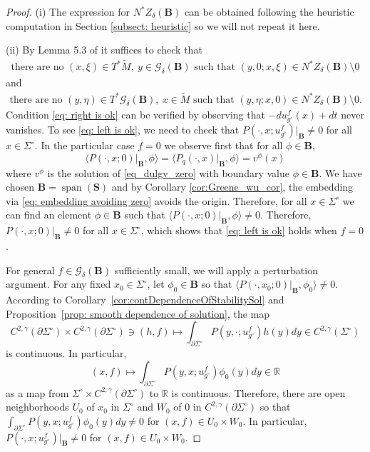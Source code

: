 \documentclass[11pt]{amsart}
\theoremstyle{definition}
\numberwithin{equation}{section}
\newcommand{\mR}{\mathbb{R}}                    %
\newcommand{\p}{\partial}
\newcommand{\BB}{\mathbf B}
\newcommand{\SSS}{\mathbf S}
\begin{document}
\begin{proof}
(i) The expression for $N^*Z_\delta(\BB)$ can be obtained following the heuristic computation in Section \ref{subsect: heuristic} so we will not repeat it here.

(ii) By Lemma 5.3 of \cite{MST} it suffices to check that 
\begin{eqnarray}
    \label{eq: left is ok}
\text{there are no } (x,\xi) \in T^*\widetilde M,\ y\in \mathcal G_\delta(\BB) \text{ such that } (y,0;x,\xi) \in N^*Z_\delta(\BB)\setminus 0
\end{eqnarray}
and \begin{eqnarray}
    \label{eq: right is ok}
\text{there are no } (y,\eta) \in T^*\mathcal G_\delta(\BB),\ x\in \widetilde M \text{ such that } (y,\eta;x,0) \in N^*Z_\delta(\BB)\setminus 0.
\end{eqnarray}
Condition \eqref{eq: right is ok} can be verified by observing that $-du_{g^\circ}^f(x) + dt$ never vanishes. To see \eqref{eq: left is ok}, we need to check that $P(\cdot, x; u_{g^\circ}^f)\vert_{\BB} \neq 0$ for all $x\in \Sigma^\circ$. In the particular case $f = 0$ we observe first that for all $\phi\in \BB$,
\[\langle P(\cdot, x; 0) \vert_{\BB}, \phi\rangle = \langle P_q(\cdot, x) \vert_{\BB}, \phi\rangle = v^\phi(x)\]
where $v^\phi$ is the solution of \eqref{eq_dulgv_zero} with boundary value $\phi\in \BB$. We have chosen $\BB = \operatorname{span}(\SSS)$ and by Corollary \ref{cor:Greene_wu_cor}, the embedding via \eqref{eq: embedding avoiding zero} avoids the origin. Therefore, for all $x\in \Sigma^\circ$ we can find an element $\phi\in \BB$ such that $\langle P(\cdot, x; 0) \vert_{\BB}, \phi\rangle \neq 0$. Therefore, $P(\cdot, x; 0)\vert_{\BB}\neq 0$ for all $x\in \Sigma^\circ$, which shows that \eqref{eq: left is ok} holds when $f= 0$.

For general $f\in \mathcal G_\delta(\BB)$ sufficiently small, we will apply a perturbation argument. For any fixed $x_0 \in \Sigma^\circ$, let $\phi_0 \in \BB$ so that $\langle P(\cdot,x_0;0)\vert_\BB, \phi_0 \rangle  \neq 0$. 
According to Corollary~\ref{cor:contDependenceOfStabilitySol} and Proposition~\ref{prop: smooth dependence of solution}, the map 
\[
    C^{2,\gamma}(\p\Sigma^\circ)\times C^{2,\gamma}(\p\Sigma^\circ) \ni (h,f)\mapsto \int_{\partial \Sigma^\circ}P(y, \cdot; u^f_{g^\circ}) h(y) dy \in C^{2,\gamma}(\Sigma^\circ)
\]
is continuous. In particular, $$(x,f)\mapsto \int_{\partial\Sigma^\circ}P(y,x; u^f_{g^\circ})\phi_0(y) dy \in \mR$$ 
as a map from $\Sigma^\circ \times C^{2,\gamma}(\p\Sigma^\circ)$ to $\mathbb R$ is continuous. Therefore, there are open neighborhoods $U_0$ of $x_0$ in $\Sigma^\circ$ and $W_0$ of $0$ in $C^{2,\gamma}(\p\Sigma^\circ)$ so that $\int_{\partial \Sigma^\circ}P(y,x;u^f_{g^\circ}) \phi_0(y) dy\neq 0$ for $(x,f)\in U_0\times W_0$. In particular, $P(\cdot, x; u^f_{g^\circ})\vert_\BB \neq 0$ for $(x,f)\in U_0\times W_0$. 


\end{proof}
\end{document}
